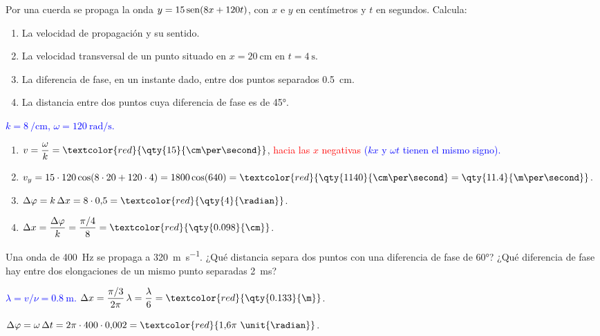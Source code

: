 \begin{exercise}
    Por una cuerda se propaga la onda \(y = 15\operatorname{sen}(8x + 120t)\), con \(x\) e \(y\) en centímetros y \(t\) en segundos.
    Calcula:
    \begin{enumerate}[label=\letraminuscula]
        \item La velocidad de propagación y su sentido.
        \item La velocidad transversal de un punto situado en \(x = \qty{20}{\cm}\) en \(t = \qty{4}{\second}\).
        \item La diferencia de fase, en un instante dado, entre dos puntos separados \qty{0.5}{\cm}.
        \item La distancia entre dos puntos cuya diferencia de fase es de \ang{45}.
    \end{enumerate}
    \begin{solu}
        \textcolor{blue}{\(k = \qty{8}{\per\cm}\), \(\omega = \qty{120}{\radian\per\second}\).}
        \begin{enumerate}[label=\letraminuscula]
            \item \(v = \dfrac{\omega}{k} = \textcolor{red}{\qty{15}{\cm\per\second}}\), \textcolor{red}{hacia las \(x\) negativas} \textcolor{blue}{(\(kx\) y \(\omega t\) tienen el mismo signo).}
            \item \(v_y = 15\cdot 120\cos(8\cdot 20 + 120\cdot 4) = 1800\cos(640) = \textcolor{red}{\qty{1140}{\cm\per\second} = \qty{11.4}{\m\per\second}}\).
            \item \(\Delta\varphi = k\,\Delta x = 8\cdot 0{,}5 = \textcolor{red}{\qty{4}{\radian}}\).
            \item \(\Delta x = \dfrac{\Delta\varphi}{k} = \dfrac{\pi/4}{8} = \textcolor{red}{\qty{0.098}{\cm}}\).
        \end{enumerate}
    \end{solu}
\end{exercise}

\begin{exercise}
    Una onda de \qty{400}{\hertz} se propaga a \qty{320}{\m\per\second}. ¿Qué distancia separa dos puntos con una diferencia de
    fase de \ang{60}? ¿Qué diferencia de fase hay entre dos elongaciones de un mismo punto separadas \qty{2}{\ms}?
    \begin{solu}
        \textcolor{blue}{\(\lambda = v/\nu = \qty{0.8}{\m}\).}
        \(\Delta x = \dfrac{\pi/3}{2\pi}\,\lambda = \dfrac{\lambda}{6} = \textcolor{red}{\qty{0.133}{\m}}\).

        \(\Delta\varphi = \omega\,\Delta t = 2\pi\cdot 400\cdot 0{,}002 = \textcolor{red}{1{,}6\pi\ \unit{\radian}}\).
    \end{solu}
\end{exercise}

